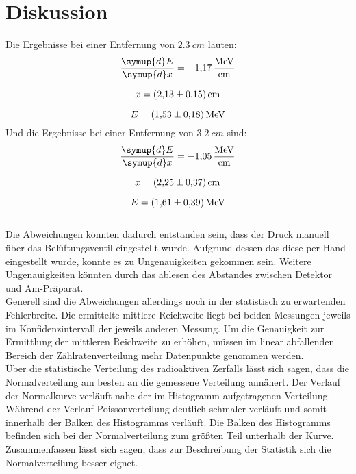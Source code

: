 \section{Diskussion}
\label{sec:Diskussion}
Die Ergebnisse bei einer Entfernung von $\qty{2.3}{cm}$ lauten:
\begin{equation*}
    \frac{\symup{d}E}{\symup{d}x}=\qty{-1.17}{\mega\electronvolt\per\centi\meter}
\end{equation*}

\begin{equation*}
   x = \qty{2.13 \pm 0.15}{cm}
\end{equation*}
   
\begin{equation*}
    E = \qty{1.53 \pm 0.18}{MeV}
\end{equation*}
Und die Ergebnisse bei einer Entfernung von $\qty{3.2}{cm}$ sind:
\begin{equation*}
    \frac{\symup{d}E}{\symup{d}x}=\qty{-1.05}{\mega\electronvolt\per\centi\meter}
\end{equation*}

\begin{equation*}
   x = \qty{2.25 \pm 0.37}{cm}
\end{equation*}
   
\begin{equation*}
    E = \qty{1.61 \pm 0.39}{MeV}
\end{equation*}
\\

\noindent Die Abweichungen könnten dadurch entstanden sein, dass 
der Druck manuell über das Belüftungsventil eingestellt wurde.
Aufgrund dessen das diese per Hand eingestellt wurde, konnte es zu Ungenauigkeiten gekommen sein. 
Weitere Ungenauigkeiten könnten durch das ablesen des Abstandes zwischen Detektor und Am-Präparat.\\

\noindent Generell sind die Abweichungen allerdings noch in der statistisch zu erwartenden Fehlerbreite.
Die ermittelte mittlere Reichweite liegt bei beiden Messungen jeweils im Konfidenzintervall der jeweils anderen Messung.
Um die Genauigkeit zur Ermittlung der mittleren Reichweite zu erhöhen, müssen im linear abfallenden
Bereich der Zählratenverteilung mehr Datenpunkte genommen werden.\\

\noindent Über die statistische Verteilung des radioaktiven Zerfalls lässt sich sagen, dass 
die Normalverteilung am besten an die gemessene Verteilung annähert.
Der Verlauf der Normalkurve verläuft nahe der im Histogramm aufgetragenen Verteilung.
Während der Verlauf Poissonverteilung deutlich schmaler verläuft und somit innerhalb der Balken des Histogramms verläuft.
Die Balken des Histogramms befinden sich bei der Normalverteilung zum größten Teil unterhalb der Kurve.
Zusammenfassen lässt sich sagen, dass zur Beschreibung der Statistik sich die Normalverteilung besser eignet.
